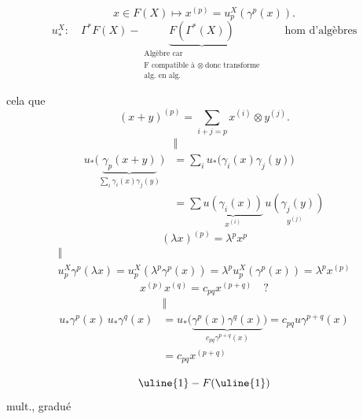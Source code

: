 \[
x\in F(X)\longmapsto x^{(p)}=u_p^X(\gamma^p(x)).
\]
\[
u_*^X:\quad \Gamma^*F(X)-
\underbrace{F(\Gamma^*(X))}_{\substack{\text{Algèbre car}\\
\text{F compatible à }\otimes\ \text{donc transforme}\\
\text{alg. en alg.}}}
\qquad \text{hom d'algèbres}
\]

cela   que
\[
(x+y)^{(p)}=\sum_{i+j=p}x^{(i)}\otimes y^{(j)}.
\]
\[
\begin{aligned}
&\Vert\\
u_*\bigl(\underbrace{\gamma_p(x+y)}_{\sum_i\gamma_i(x)\gamma_j(y)}\bigr)
&=\sum_i u_*\bigl(\gamma_i(x)\gamma_j(y)\bigr)\\
&=\sum\underbrace{u(\gamma_i(x))}_{x^{(i)}}\,
\underset{y^{(j)}}{u(\gamma_j(y))}
\end{aligned}
\]
\[
(\lambda x)^{(p)}=\lambda^p x^p
\]
\[
\begin{gathered}
\Vert\\
u_p^X\gamma^p(\lambda x)=u_p^X(\lambda^p\gamma^p(x))
=\lambda^p u_p^X(\gamma^p(x))=\lambda^p x^{(p)}
\end{gathered}
\]
\[
x^{(p)}x^{(q)}=c_{pq}x^{(p+q)}\quad ?
\]
\[
\begin{aligned}
&\Vert\\
u_*\gamma^p(x)\,u_*\gamma^q(x)
&=u_*\bigl(\underbrace{\gamma^p(x)\gamma^q(x)}_{c_{pq}\gamma^{p+q}(x)}\bigr)
=c_{pq}u\gamma^{p+q}(x)\\
&=c_{pq}x^{(p+q)}
\end{aligned}
\]

\[
\uline{1}-F(\uline{1})
\]
mult.,  gradué

